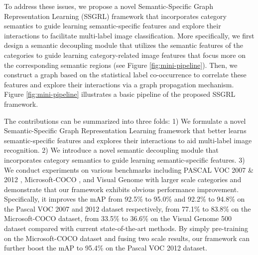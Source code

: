 \documentclass[10pt,twocolumn,letterpaper]{article}
\begin{document}
To address these issues, we propose a novel Semantic-Specific Graph Representation Learning (SSGRL) framework that incorporates category semantics to guide learning semantic-specific features and explore their interactions to facilitate multi-label image classification. More specifically, we first design a semantic decoupling module that utilizes the semantic features of the categories to guide learning category-related image features that focus more on the corresponding semantic regions (see Figure \ref{fig:mini-pipeline}). Then, we construct a graph based on the statistical label co-occurrence to correlate these features and explore their interactions via a graph propagation mechanism. Figure \ref{fig:mini-pipeline} illustrates a basic pipeline of the proposed SSGRL framework.

The contributions can be summarized into three folds: 1) We formulate a novel Semantic-Specific Graph Representation Learning framework that better learns semantic-specific features and explores their interactions to aid multi-label image recognition. 2) We introduce a novel semantic decoupling module that incorporates category semantics to guide learning semantic-specific features. 3) We conduct experiments on various benchmarks including PASCAL VOC 2007 \& 2012 \cite{everingham2010pascal}, Microsoft-COCO \cite{lin2014microsoft}, and Visual Genome with larger scale categories \cite{krishna2017visual} and demonstrate that our framework exhibits obvious performance improvement. Specifically, it improves the mAP from 92.5\% to 95.0\% and 92.2\% to 94.8\% on the Pascal VOC 2007 and 2012 dataset respectively, from 77.1\% to 83.8\% on the Microsoft-COCO dataset, from 33.5\% to 36.6\% on the Visual Genome 500 dataset compared with current state-of-the-art methods. By simply pre-training on the Microsoft-COCO dataset and fusing two scale results, our framework can further boost the mAP to 95.4\% on the Pascal VOC 2012 dataset.
\end{document}
